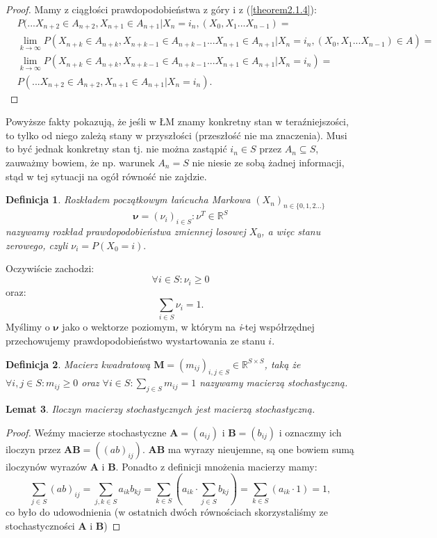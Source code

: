 \documentclass[a4paper]{article}
\theoremstyle{defn}
\newtheorem{defn}{Definicja}[subsection]
\theoremstyle{theorem}
\theoremstyle{lemma}
\newtheorem{lemma}[defn]{Lemat}
\theoremstyle{cor}
\theoremstyle{fact}
\begin{document}
\begin{proof}
Mamy z ciągłości prawdopodobieństwa z góry i z (\ref{theorem2.1.4}):
\begin{align*}
&P(...X_{n+2} \in A_{n+2}, X_{n+1} \in A_{n+1}|X_n = i_n, (X_{0}, X_{1} ... X_{n-1}) =\\ &\lim_{k \to \infty} P(X_{n+k} \in A_{n+k}, X_{n+k-1} \in A_{n+k-1}...X_{n+1} \in A_{n+1}|X_n = i_n, (X_{0}, X_{1} ... X_{n-1}) \in A) = \\
&\lim_{k \to \infty} P(X_{n+k} \in A_{n+k}, X_{n+k-1} \in A_{n+k-1}...X_{n+1} \in A_{n+1}|X_n = i_n) = \\
&P(...X_{n+2} \in A_{n+2}, X_{n+1} \in A_{n+1}|X_n = i_n).
\end{align*}
\end{proof}
Powyższe fakty pokazują, że jeśli w ŁM znamy konkretny stan w teraźniejszości, to tylko od niego zależą stany w przyszłości (przeszłość nie ma znaczenia). Musi to być jednak konkretny stan tj. nie można zastąpić $i_n \in S$ przez $A_n \subseteq S$, zauważmy bowiem, że np. warunek $A_n = S$ nie niesie ze sobą żadnej informacji, stąd w tej sytuacji na ogół równość nie zajdzie.
\begin{defn}\label{defn2.1.6}
\textit{Rozkładem początkowym}  łańcucha Markowa $(X_n)_{n \in \{0,1,2...\}}$ 
$$\boldsymbol{\nu} = (\nu_i)_{i \in S}: \nu^T \in \mathbb{R}^S$$
nazywamy rozkład prawdopodobieństwa zmiennej losowej $X_0$, a więc stanu zerowego, czyli $\nu_i = P(X_0 = i).$
\end{defn}
 Oczywiście zachodzi:
 $$\forall i \in S: \nu_i \geq 0$$ 
 oraz:
 $$\sum\limits_{i \in S}\nu_i = 1.$$ 
 Myślimy o $\boldsymbol{\nu}$ jako o wektorze poziomym, w którym na \textit{i}-tej współrzędnej przechowujemy prawdopodobieństwo wystartowania ze stanu $i$.
\begin{defn}\label{2.1.7}
Macierz kwadratową $\boldsymbol{M} = (m_{ij})_{i,j \in S} \in \mathbb{R}^{S \times S}$, taką że $\forall i, j \in S: m_{ij} \geq 0$ oraz $\forall i \in S: \sum\limits_{j \in S} m_{ij} = 1$ nazywamy \textit{macierzą stochastyczną}. 
\end{defn}
\begin{lemma}\label{lemma2.1.8}
Iloczyn macierzy stochastycznych jest macierzą stochastyczną.
\end{lemma}
\begin{proof}
Weźmy macierze stochastyczne $\boldsymbol{A}=(a_{ij})$ i $\boldsymbol{B}=(b_{ij})$ i oznaczmy ich iloczyn przez $\boldsymbol{AB} = ((ab)_{ij})$. $\boldsymbol{AB}$ ma wyrazy nieujemne, są one bowiem sumą iloczynów wyrazów $\boldsymbol{A}$ i $\boldsymbol{B}$. Ponadto z definicji mnożenia macierzy mamy: $$\sum\limits_{j \in S} (ab)_{ij} = \sum\limits_{j, k \in S} a_{ik}b_{kj} = \sum\limits_{k \in S} (a_{ik} \cdot \sum\limits_{j \in S} b_{kj}) =  \sum\limits_{k \in S} (a_{ik} \cdot 1) = 1,$$ co było do udowodnienia (w ostatnich dwóch równościach skorzystaliśmy ze stochastyczności $\boldsymbol{A}$ i $\boldsymbol{B}$) \end{proof}
\end{document}
